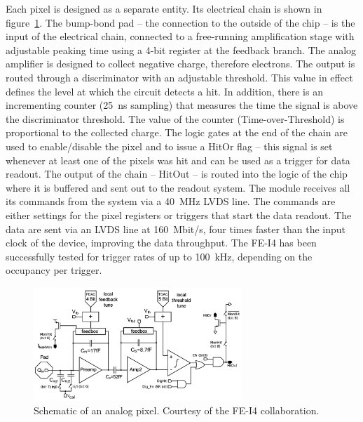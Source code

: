 Each pixel is designed as a separate entity. Its electrical chain is shown in figure~\ref{fig:anapix}. The bump-bond pad -- the connection to the outside of the chip -- is the input of the electrical chain, connected to a free-running amplification stage with adjustable peaking time using a 4-bit register at the feedback branch. The analog amplifier is designed to collect negative charge, therefore electrons. The output is routed through a discriminator with an adjustable threshold. This value in effect defines the level at which the circuit detects a hit. In addition, there is an incrementing counter (25~ns sampling) that measures the time the signal is above the discriminator threshold. The value of the counter (Time-over-Threshold) is proportional to the collected charge. The logic gates at the end of the chain are used to enable/disable the pixel and to issue a HitOr flag -- this signal is set whenever at least one of the pixels was hit and can be used as a trigger for data readout. The output of the chain -- HitOut -- is routed into the logic of the chip where it is buffered and sent out to the readout system. The module receives all its commands from the system via a 40~MHz LVDS line. The commands are either settings for the pixel registers or triggers that start the data readout. The data are sent via an LVDS line at 160~Mbit/s, four times faster than the input clock of the device, improving the data throughput. The FE-I4 has been successfully tested for trigger rates of up to 100~kHz, depending on the occupancy per trigger. 

\begin{figure}[!t]
\centering
\includegraphics[width=0.7\textwidth]{04_charge_monitoring/pics/analogPix}
\caption{Schematic of an analog pixel. Courtesy of the FE-I4 collaboration.}
\label{fig:anapix}
\end{figure}


